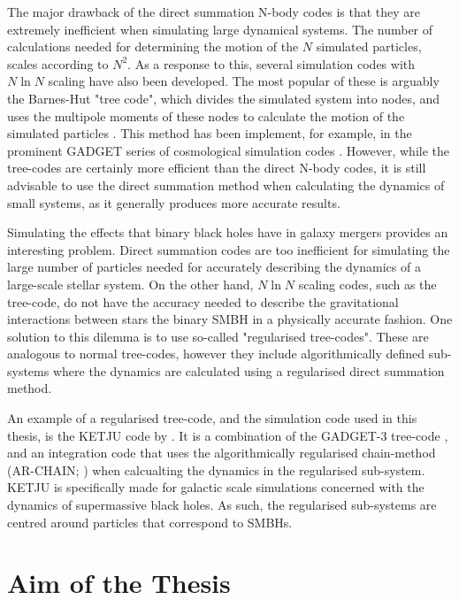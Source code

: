\documentclass[english, twoside]{HYgradu}
\begin{document}
The major drawback of the direct summation N-body codes is that they are extremely inefficient when simulating large dynamical systems. The number of calculations needed for determining the motion of the $N$ simulated particles, scales according to $N^2$. As a response to this, several simulation codes with $N \ln N$ scaling have also been developed. The most popular of these is arguably the Barnes-Hut "tree code", which divides the simulated system into nodes, and uses the multipole moments of these nodes to calculate the motion of the simulated particles \citep{Barnes1986}. This method has been implement, for example, in the prominent GADGET series of cosmological simulation codes \citep{Springel2001}. However, while the tree-codes are certainly more efficient than the direct N-body codes, it is still advisable to use the direct summation method when calculating the dynamics of small systems, as it generally produces more accurate results.

Simulating the effects that binary black holes have in galaxy mergers provides an interesting problem. Direct summation codes are too inefficient for simulating the large number of particles needed for accurately describing the dynamics of a large-scale stellar system. On the other hand, $N \ln N$ scaling codes, such as the tree-code, do not have the accuracy needed to describe the gravitational interactions between stars the binary SMBH in a physically accurate fashion. One solution to this dilemma is to use so-called "regularised tree-codes". These are analogous to normal tree-codes, however they include algorithmically defined sub-systems where the dynamics are calculated using a regularised direct summation method.

An example of a regularised tree-code, and the simulation code used in this thesis, is the KETJU code by \cite{Rantala2017KETJU}. It is a combination of the GADGET-3 tree-code \citep{Springel2005}, and an integration code that uses the algorithmically regularised chain-method (AR-CHAIN; \citealt{Mikkola2008ARCHAIN}) when calcualting the dynamics in the regularised sub-system. KETJU is specifically made for galactic scale simulations concerned with the dynamics of supermassive black holes. As such, the regularised sub-systems are centred around particles that correspond to SMBHs.

\section{Aim of the Thesis}
\end{document}
